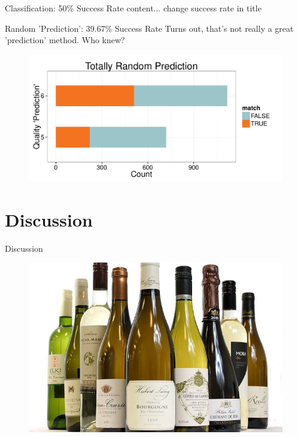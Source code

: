 \documentclass{beamer}
\begin{document}
\begin{frame}{Classification: 50\% Success Rate}
content... change success rate in title
\end{frame}


\begin{frame}{Random 'Prediction': 39.67\% Success Rate}
	Turns out, that's not really a great 'prediction' method. Who knew?
	\begin{figure}
		\centering
		\includegraphics[width=\textwidth]{../images/RandomPrediction.pdf}
	\end{figure}
\end{frame}


\section{Discussion}
\begin{frame}{Discussion}
	\begin{figure}
		\centering
		\includegraphics[width=\textwidth]{../images/wines.jpg}
	\end{figure}
\end{frame}
\end{document}
